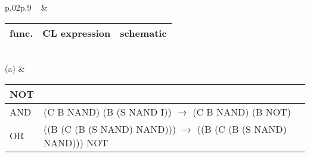 \renewcommand{\colwidth}{.7cm}
\begingroup\tabcolsep=2pt
\hspace{-10cm}\begin{table}[p]
\tiny
\begin{tabular}{p{.02\linewidth}p{.9\linewidth}}
 ~ & 
  \begin{tabular}{|m{\colwidth}|m{2.5cm}|m{4.5cm}|}
    \hline
    func. & CL expression & schematic\\
    \hline\hline
  \end{tabular}\\
(a) & 
  \begin{tabular}{|m{\colwidth}|m{2.5cm}|m{4.5cm}|}
    {\color{OliveGreen}NOT} & \color{OliveGreen}{(S NAND I)} & 
    \begin{tikzpicture}
      \node (x) at (0,0) {$x$};
      \node (nand)[nand gate US, draw, right=.6cm of x] {};
      \node (equiv)[right=.2cm of nand] {$\equiv$};
      \node (not) [not gate US, draw=OliveGreen, fill=OliveGreen!25, right=.2cm of equiv] {};

      \draw (x.east) -| +(.2, 0)  |- (nand.input 1);
      \draw (x.east) -| +(.2, 0)  |- (nand.input 2);

    \end{tikzpicture}\\
    \hline
    AND & (C B NAND) (B {\color{OliveGreen}(S NAND I)}) \newline
    $\rightarrow$ (C B NAND) (B {\color{OliveGreen}NOT}) & 
    \begin{tikzpicture}
      \node (y) at (0cm,1cm) {$y$};
      \node (x) at (0cm,0cm) {$x$};
      \node (nand) at (1cm, .5cm) [nand gate US, draw] {};
      \node (not) [not gate US, draw=OliveGreen, fill=OliveGreen!25, right=.4cm of nand] {};


      \draw(nand.output) -- (not.west);
      \draw (x.east) -| +(.1, 0)  |- (nand.input 2);
      \draw (y.east) -| +(.1, 0)  |- (nand.input 1);

    \end{tikzpicture}\\
    \hline
    OR & ((B (C (B (S NAND) NAND))) \newline {\color{OliveGreen}(S NAND I)} \newline
    $\rightarrow$ ((B (C (B (S NAND) NAND))) {\color{OliveGreen}NOT} & 
    \begin{tikzpicture}
      \node (y) at (0,1cm) {$y$};
      \node (x) at (0,0cm) {$x$};
      \node (not1) [not gate US, draw=OliveGreen, fill=OliveGreen!25, right=.4cm of y] {};
      \node (not2) [not gate US, draw=OliveGreen, fill=OliveGreen!25, right=.4cm of x] {};
      \node (nand)[nand gate US, draw] at (1.75, .5){};


\end{tikzpicture}
\end{tabular}
\end{tabular}
\end{table}
